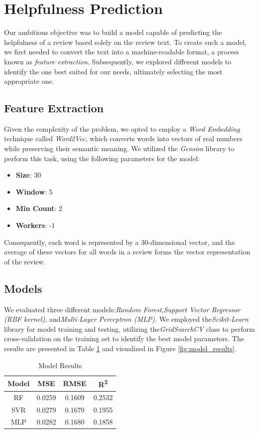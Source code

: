 \section{Helpfulness Prediction}
Our ambitious objective was to build a model capable of predicting the helpfulness of a review based solely on the review text. 
To create such a model, we first needed to convert the text into a machine-readable format, a process known as \textit{feature extraction}. 
Subsequently, we explored different models to identify the one best suited for our needs, ultimately selecting the most appropriate one.

\subsection{Feature Extraction}
Given the complexity of the problem, we opted to employ a \textit{Word Embedding} technique called \textit{Word2Vec}, which converts words into 
vectors of real numbers while preserving their semantic meaning. We utilized the \textit{Gensim} library to perform this task, using the 
following parameters for the model:
\begin{itemize}[noitemsep, leftmargin=*]
    \item \textbf{Size}: 30
    \item \textbf{Window}: 5
    \item \textbf{Min Count}: 2
    \item \textbf{Workers}: -1
\end{itemize}
Consequently, each word is represented by a 30-dimensional vector, and the average of these vectors for all words in a review forms the vector 
representation of the review.

\subsection{Models}
We evaluated three different models:\textit{Random Forest},\textit{Support Vector Regressor (RBF kernel)}, and\textit{Multi-Layer Perceptron (MLP)}. 
We employed the\textit{Scikit-Learn} library for model training and testing, utilizing the\textit{GridSearchCV} class to perform cross-validation on 
the training set to identify the best model parameters. The results are presented in Table \ref{tab:model_results} and visualized in Figure 
\ref{fig:model_results}.

\begin{table}[H]
    \footnotesize
    \centering
    \caption{Model Results}
    \label{tab:model_results}
    \begin{tabular}{|c|c|c|c|}
        \hline
        Model & MSE & RMSE & R\textsuperscript{2} \\
        \hline
        RF & 0.0259 & 0.1609 & 0.2532 \\
        SVR & 0.0279 & 0.1670 & 0.1955 \\
        MLP & 0.0282 & 0.1680 & 0.1858 \\
        \hline
    \end{tabular}
\end{table}

